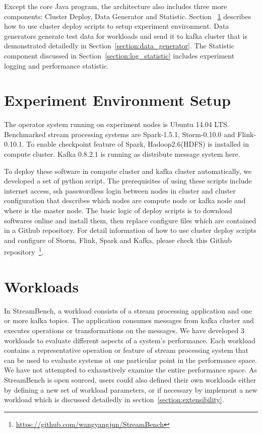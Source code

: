 Except the core Java program, the architecture also includes three more components: Cluster Deploy, Data Generator and Statistic. Section ~\ref{chapter:environment_setup} describes how to use cluster deploy scripts to setup experiment environment. Data generators generate test data for workloads and send it to kafka cluster that is demonstrated detailedly in Section~\ref{section:data_generator}. The Statistic component discussed in Section~\ref{section:log_statistic} includes experiment logging and performance statistic. 

\section{Experiment Environment Setup}
\label{chapter:environment_setup}

The operator system running on experiment nodes is Ubuntu 14.04 LTS. Benchmarked stream processing systems are Spark-1.5.1, Storm-0.10.0 and Flink-0.10.1. To enable checkpoint feature of Spark, Hadoop2.6(HDFS) is installed in compute cluster. Kafka 0.8.2.1 is running as distribute message system here. 

To deploy these software in compute cluster and kafka cluster automatically, we developed a set of python script. The prerequisites of using these scripts include internet access, ssh passwordless login between nodes in cluster and cluster configuration that describes which nodes are compute node or kafka node and where is the master node. The basic logic of deploy scripts is to download softwares online and install them, then replace configure files which are contained in a Github repository. For detail information of how to use cluster deploy scripts and configure of Storm, Flink, Spark and Kafka, please check this Github repository~\footnote{\url{https://github.com/wangyangjun/StreamBench}}.

\section{Workloads}
\label{section:workloads}

In StreamBench, a workload consists of a stream processing application and one or more kafka topics. The application consumes messages from kafka cluster and executes operations or transformations on the messages. We have developed 3 workloads to evaluate different aspects of a system's performance. Each workload contains a representative operation or feature of stream processing system that can be used to evaluate systems at one particular point in the performance space. We have not attempted to exhaustively examine the entire performance space. As StreamBench is open sourced, users could also defined their own workloads either by defining a new set of workload parameters, or if necessary by implement a new workload which is discussed detailedly in section~\ref{section:extensibility}.


